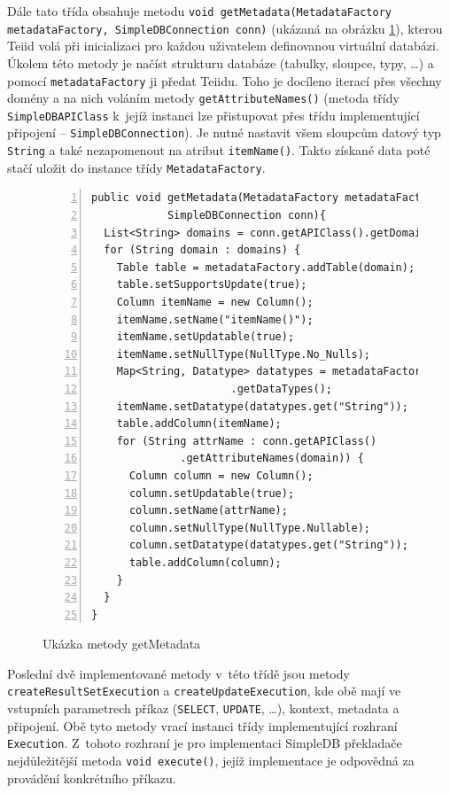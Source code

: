 \documentclass[oneside,12pt]{fithesis2}
\begin{document}
Dále tato třída obsahuje metodu \label{getMetadata}\texttt{void getMetadata(Metadata\allowbreak Factory metadataFactory, SimpleDBConnection conn)} (ukázaná na obrázku \ref{getMetadata}), kterou Teiid volá při inicializaci pro každou uživatelem definovanou virtuální databázi. Úkolem této metody je načíst strukturu databáze (tabulky, sloupce, typy, \dots) a pomocí \texttt{metadataFactory} ji předat Teiidu. Toho je docíleno iterací přes všechny domény a na nich voláním metody \texttt{getAttributeNames()} (metoda třídy \texttt{SimpleDBAPIClass} k~jejíž instanci lze přistupovat přes třídu implementující připojení -- \texttt{SimpleDB\allowbreak Connection}). Je nutné nastavit všem sloupcům datový typ \texttt{String} a také nezapomenout na atribut \texttt{itemName()}. Takto získané data poté stačí uložit do instance třídy \texttt{MetadataFactory}.

\begin{figure}[h]
 \begin{Verbatim}[fontsize=\small,numbers=left]
public void getMetadata(MetadataFactory metadataFactory, 
			SimpleDBConnection conn){
  List<String> domains = conn.getAPIClass().getDomains();
  for (String domain : domains) {
    Table table = metadataFactory.addTable(domain);
    table.setSupportsUpdate(true);
    Column itemName = new Column();
    itemName.setName("itemName()");
    itemName.setUpdatable(true);
    itemName.setNullType(NullType.No_Nulls);
    Map<String, Datatype> datatypes = metadataFactory
				      .getDataTypes();
    itemName.setDatatype(datatypes.get("String"));
    table.addColumn(itemName);
    for (String attrName : conn.getAPIClass()
			  .getAttributeNames(domain)) {
      Column column = new Column();
      column.setUpdatable(true);
      column.setName(attrName);
      column.setNullType(NullType.Nullable);
      column.setDatatype(datatypes.get("String"));
      table.addColumn(column);
    }
  }
}
 \end{Verbatim}
\label{getMetadata}
\caption{Ukázka metody getMetadata}
\end{figure}

Poslední dvě implementované metody v~této třídě jsou metody \texttt{createResultSetExecution} a \texttt{createUpdateExecution}, kde obě mají ve vstupních parametrech příkaz (\texttt{SELECT}, \texttt{UPDATE}, \dots), kontext, metadata a připojení. Obě tyto metody vrací instanci třídy implementující rozhraní \texttt{Execution}. Z~tohoto rozhraní je pro implementaci SimpleDB překladače nejdůležitější metoda \texttt{void execute()}, jejíž implementace je odpovědná za provádění konkrétního příkazu.
\end{document}
